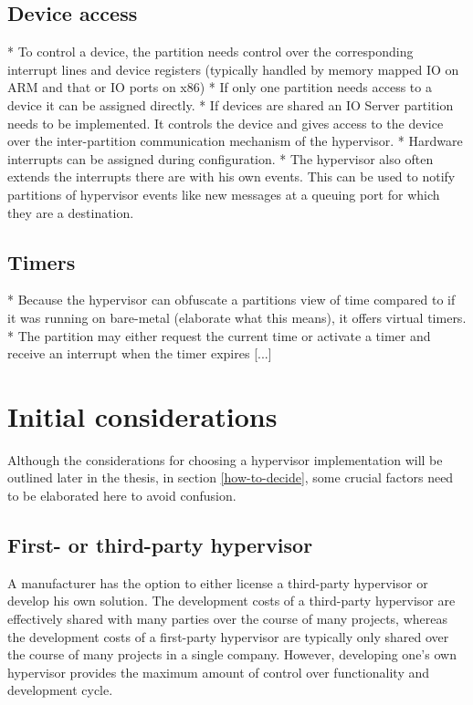 \subsection{Device access}
* To control a device, the partition needs control over the corresponding interrupt lines and device registers (typically handled by memory mapped IO on ARM and that or IO ports on x86)
* If only one partition needs access to a device it can be assigned directly.
* If devices are shared an IO Server partition needs to be implemented. It controls the device and gives access to the device over the inter-partition communication mechanism of the hypervisor. 
* Hardware interrupts can be assigned during configuration. 
* The hypervisor also often extends the interrupts there are with his own events. This can be used to notify partitions of hypervisor events like new messages at a queuing port for which they are a destination.
\subsection{Timers}
* Because the hypervisor can obfuscate a partitions view of time compared to if it was running on bare-metal (elaborate what this means), it offers virtual timers.
* The partition may either request the current time or activate a timer and receive an interrupt when the timer expires [...]

\section{Initial considerations}
Although the considerations for choosing a hypervisor implementation will be outlined later in the thesis, in section \ref{how-to-decide}, some crucial factors need to be elaborated here to avoid confusion.
\subsection{First- or third-party hypervisor}
A manufacturer has the option to either license a third-party hypervisor or develop his own solution. The development costs of a third-party hypervisor are effectively shared with many parties over the course of many projects, whereas the development costs of a first-party hypervisor are typically only shared over the course of many projects in a single company. However, developing one's own hypervisor provides the maximum amount of control over functionality and development cycle.

